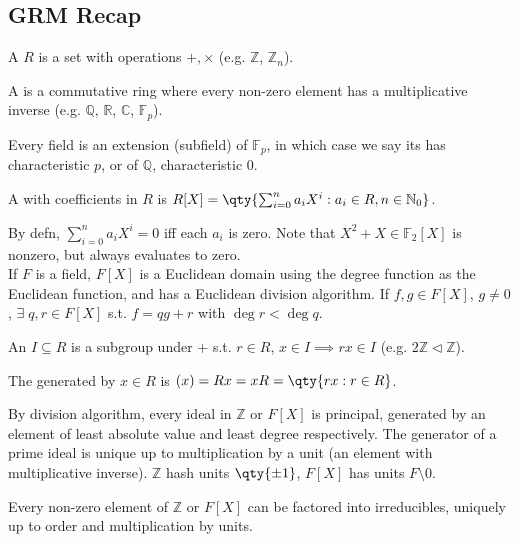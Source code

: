 \subsection{GRM Recap}
\begin{definition}[Ring]
    A  $R$ is a set with operations $+, \times$ (e.g. $\mathbb{Z}$, $\mathbb{Z}_n$).
\end{definition}
\begin{definition}[Field]
    A  is a commutative ring where every non-zero element has a multiplicative inverse (e.g. $\mathbb{Q}$, $\mathbb{R}$, $\mathbb{C}$, $\mathbb{F}_p$).
\end{definition}
Every field is an extension (subfield) of $\mathbb{F}_p$, in which case we say its has characteristic $p$, or of $\mathbb{Q}$, characteristic 0. \\
\begin{definition}
    A  with coefficients in $R$ is $R[X] = \qty{\sum_{i=0}^{n} a_i X^i : a_i \in R, n \in \mathbb{N}_0}$.
\end{definition}
By defn, $\sum_{i=0}^n a_i X^i = 0$ iff each $a_i$ is zero.
Note that $X^2 + X \in \mathbb F_2[X]$ is nonzero, but always evaluates to zero. \\
If $F$ is a field, $F[X]$ is a Euclidean domain using the degree function as the Euclidean function, and has a Euclidean division algorithm.
If $f, g \in F[X]$, $g \neq 0$, $\exists \; q, r \in F[X]$ s.t. $f = qg + r$ with $\deg r < \deg q$.

\begin{definition}[Ideal]
    An  $I \subseteq R$ is a subgroup under $+$ s.t. $r \in R$, $x \in I \implies rx \in I$ (e.g. $2 \mathbb{Z} \triangleleft \mathbb{Z}$).
\end{definition}
\begin{definition}
    The  generated by $x \in R$ is $(x) = Rx = xR = \qty{rx : r \in R}$.
\end{definition}
By division algorithm, every ideal in $\mathbb{Z}$ or $F[X]$ is principal, generated by an element of least absolute value and least degree respectively.
The generator of a prime ideal is unique up to multiplication by a unit (an element with multiplicative inverse).
$\mathbb{Z}$ hash units $\qty{\pm 1}$, $F[X]$ has units $F \setminus \qty{0}$.

Every non-zero element of $\mathbb{Z}$ or $F[X]$ can be factored into irreducibles, uniquely up to order and multiplication by units.

